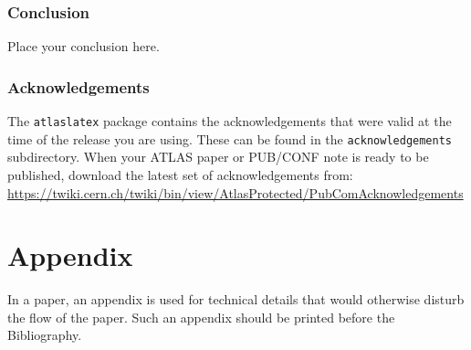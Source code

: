 \documentclass[PAPER, atlasdraft=true, texlive=2017, UKenglish]{\ATLASLATEXPATH atlasdoc}
\begin{document}
\section{Conclusion}
\label{sec:conclusion}

Place your conclusion here.


\section*{Acknowledgements}

%

The \texttt{atlaslatex} package contains the acknowledgements that were valid 
at the time of the release you are using.
These can be found in the \texttt{acknowledgements} subdirectory.
When your ATLAS paper or PUB/CONF note is ready to be published,
download the latest set of acknowledgements from:\\
\url{https://twiki.cern.ch/twiki/bin/view/AtlasProtected/PubComAcknowledgements}


\clearpage
\appendix
\part*{Appendix}

In a paper, an appendix is used for technical details that would otherwise disturb the flow of the paper.
Such an appendix should be printed before the Bibliography.

\printbibliography
% 
% 

% 
\end{document}

